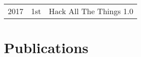 \documentclass[]{deedy-resume-openfont}
\begin{document}
\begin{minipage}[t]{0.66\textwidth}
\begin{tabular}{rll}
2017	     & 1st & Hack All The Things 1.0\\

\end{tabular}
\sectionsep


\section{Publications} 
\renewcommand\refname{\vskip -1.5em} %


\nocite{*}

\end{minipage} 
\end{document}
